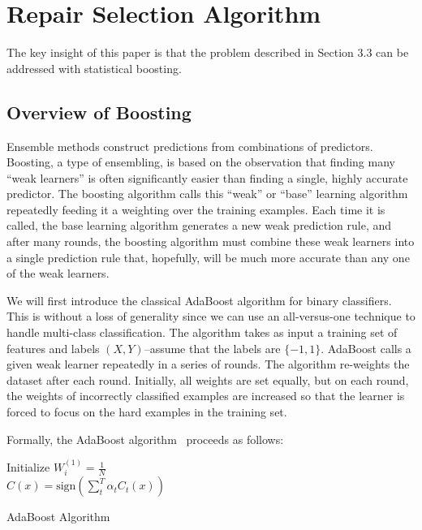 \section{Repair Selection Algorithm}
The key insight of this paper is that the problem described in Section 3.3 can be addressed with statistical boosting.

\subsection{Overview of Boosting}
Ensemble methods construct predictions from combinations of predictors.
Boosting, a type of ensembling, is based on the observation that finding many ``weak learners'' is often significantly easier than finding a single, highly accurate predictor. 
The boosting algorithm calls this ``weak'' or ``base'' learning algorithm repeatedly feeding it a  weighting over the training examples.
Each time it is called, the base learning algorithm generates a new weak prediction rule, and after many rounds, the boosting algorithm must combine these weak learners into a single prediction rule that, hopefully, will be much more accurate than any one of the weak learners.

We will first introduce the classical AdaBoost algorithm for binary classifiers.
This is without a loss of generality since we can use an all-versus-one technique to handle multi-class classification.
The algorithm takes as input a training set of features and labels $(X,Y)$--assume that the labels are $\{-1, 1\}$.
AdaBoost calls a given weak learner repeatedly in a series of rounds. 
The algorithm re-weights the dataset after each round. Initially, all weights are set equally, but on each round, the weights of incorrectly classified examples are increased so that the learner is forced to focus on the hard examples in the training set.

Formally, the AdaBoost algorithm~\cite{freund1995desicion} proceeds as follows:
\begin{algorithm}
Initialize $W^{(1)}_i = \frac{1}{N}$\\
\Return $C(x) = \text{sign}(\sum_t^T \alpha_t C_t(x) )$
\caption{AdaBoost Algorithm}
\label{alg:adaboost}
\end{algorithm}

